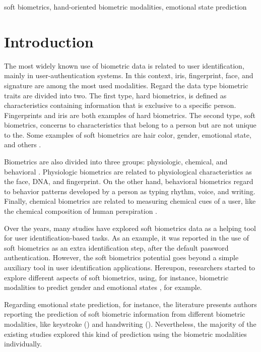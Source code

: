 \documentclass[conference]{IEEEtran}
\begin{document}
\begin{IEEEkeywords}
soft biometrics, hand-oriented biometric modalities,  emotional state prediction
\end{IEEEkeywords}

\section{Introduction}

The most widely known use of biometric data is related to user identification, mainly in user-authentication systems. In this context, iris, fingerprint, face, and signature are among the most used modalities. Regard the data type biometric traits are divided into two. The first type, hard biometrics, is defined as characteristics containing information that is exclusive to a specific person. Fingerprints and iris are both examples of hard biometrics. The second type, soft biometrics, concerns to characteristics that belong to a person but are not unique to the. Some examples of soft biometrics are hair color, gender, emotional state, and others \cite{handbook-multibiometrics,marjory-emotion1}. 

Biometrics are also divided into three groups: physiologic, chemical, and behavioral \cite{handbook-biometrics}. Physiologic biometrics are related to physiological characteristics as the face, DNA, and fingerprint. On the other hand, behavioral biometrics regard to behavior patterns developed by a person as typing rhythm, voice, and writing. Finally, chemical biometrics are related to measuring chemical cues of a user, like the chemical composition of human perspiration \cite{chemical-biometric-example}. 

Over the years, many studies have explored soft biometrics data as a helping tool for user identification-based tasks. As an example, it was reported in \cite{continuous-auth} the use of soft biometrics as an extra identification step, after the default password authentication. 
However, the soft biometrics potential goes beyond a simple auxiliary tool in user identification applications. Hereupon, researchers started to explore different aspects of soft biometrics, using, for instance, biometric modalities to predict gender \cite{hw-gender1, cheng-hw-gender} and emotional states \cite{cheng-emotional, ks-emotion1, cheng-hw-gender}, for example. 

Regarding emotional state prediction, for instance, the literature presents authors reporting the prediction of soft biometric information from different biometric modalities, like keystroke (\cite{ks-emotion1, ks-emotion2-mouse}) and handwriting (\cite{cheng-emotional}). Nevertheless, the majority of the existing studies explored this kind of prediction using the biometric modalities individually.
\end{document}
